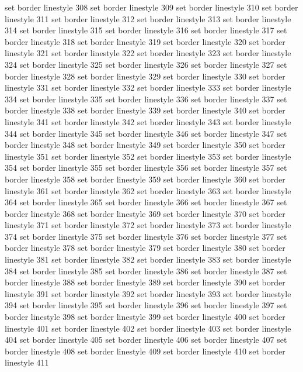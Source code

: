 set border linestyle 308
set border linestyle 309
set border linestyle 310
set border linestyle 311
set border linestyle 312
set border linestyle 313
set border linestyle 314
set border linestyle 315
set border linestyle 316
set border linestyle 317
set border linestyle 318
set border linestyle 319
set border linestyle 320
set border linestyle 321
set border linestyle 322
set border linestyle 323
set border linestyle 324
set border linestyle 325
set border linestyle 326
set border linestyle 327
set border linestyle 328
set border linestyle 329
set border linestyle 330
set border linestyle 331
set border linestyle 332
set border linestyle 333
set border linestyle 334
set border linestyle 335
set border linestyle 336
set border linestyle 337
set border linestyle 338
set border linestyle 339
set border linestyle 340
set border linestyle 341
set border linestyle 342
set border linestyle 343
set border linestyle 344
set border linestyle 345
set border linestyle 346
set border linestyle 347
set border linestyle 348
set border linestyle 349
set border linestyle 350
set border linestyle 351
set border linestyle 352
set border linestyle 353
set border linestyle 354
set border linestyle 355
set border linestyle 356
set border linestyle 357
set border linestyle 358
set border linestyle 359
set border linestyle 360
set border linestyle 361
set border linestyle 362
set border linestyle 363
set border linestyle 364
set border linestyle 365
set border linestyle 366
set border linestyle 367
set border linestyle 368
set border linestyle 369
set border linestyle 370
set border linestyle 371
set border linestyle 372
set border linestyle 373
set border linestyle 374
set border linestyle 375
set border linestyle 376
set border linestyle 377
set border linestyle 378
set border linestyle 379
set border linestyle 380
set border linestyle 381
set border linestyle 382
set border linestyle 383
set border linestyle 384
set border linestyle 385
set border linestyle 386
set border linestyle 387
set border linestyle 388
set border linestyle 389
set border linestyle 390
set border linestyle 391
set border linestyle 392
set border linestyle 393
set border linestyle 394
set border linestyle 395
set border linestyle 396
set border linestyle 397
set border linestyle 398
set border linestyle 399
set border linestyle 400
set border linestyle 401
set border linestyle 402
set border linestyle 403
set border linestyle 404
set border linestyle 405
set border linestyle 406
set border linestyle 407
set border linestyle 408
set border linestyle 409
set border linestyle 410
set border linestyle 411
